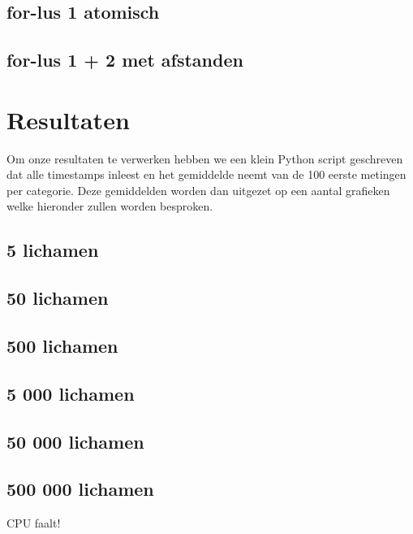 \documentclass{article}
\begin{document}
\subsection{for-lus 1 atomisch}

\subsection{for-lus 1 + 2 met afstanden}


\section{Resultaten}
Om onze resultaten te verwerken hebben we een klein Python script geschreven dat
alle timestamps inleest en het gemiddelde neemt van de 100 eerste metingen per
categorie. Deze gemiddelden worden dan uitgezet op een aantal grafieken welke
hieronder zullen worden besproken.

\subsection{5 lichamen}

\subsection{50 lichamen}

\subsection{500 lichamen}

\subsection{5 000 lichamen}

\subsection{50 000 lichamen}

\subsection{500 000 lichamen}
CPU faalt!

\end{document}

